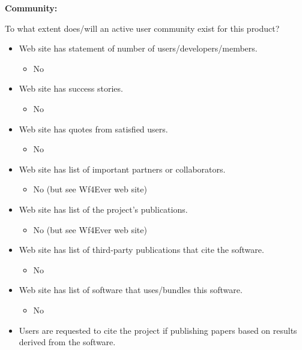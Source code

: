 \textbf{Community:}

To what extent does/will an active user community exist for this
product?

\begin{itemize}
\itemsep1pt\parskip0pt
\item
  Web site has statement of number of users/developers/members.

  \begin{itemize}
  \itemsep1pt\parskip0pt
  \item
    No
  \end{itemize}
\item
  Web site has success stories.

  \begin{itemize}
  \itemsep1pt\parskip0pt
  \item
    No
  \end{itemize}
\item
  Web site has quotes from satisfied users.

  \begin{itemize}
  \itemsep1pt\parskip0pt
  \item
    No
  \end{itemize}
\item
  Web site has list of important partners or collaborators.

  \begin{itemize}
  \itemsep1pt\parskip0pt
  \item
    No (but see Wf4Ever web site)
  \end{itemize}
\item
  Web site has list of the project's publications.

  \begin{itemize}
  \itemsep1pt\parskip0pt
  \item
    No (but see Wf4Ever web site)
  \end{itemize}
\item
  Web site has list of third-party publications that cite the software.

  \begin{itemize}
  \itemsep1pt\parskip0pt
  \item
    No
  \end{itemize}
\item
  Web site has list of software that uses/bundles this software.

  \begin{itemize}
  \itemsep1pt\parskip0pt
  \item
    No
  \end{itemize}
\item
  Users are requested to cite the project if publishing papers based on
  results derived from the software.


\end{itemize}
